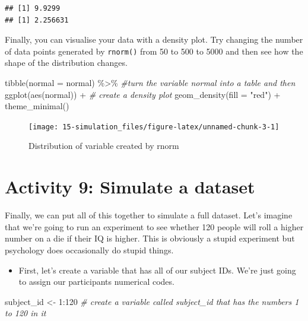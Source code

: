\documentclass[
  oneside]{book}
\newenvironment{Shaded}{\begin{snugshade}}{\end{snugshade}}
\newcommand{\AttributeTok}[1]{\textcolor[rgb]{0.77,0.63,0.00}{#1}}
\newcommand{\CommentTok}[1]{\textcolor[rgb]{0.56,0.35,0.01}{\textit{#1}}}
\newcommand{\DecValTok}[1]{\textcolor[rgb]{0.00,0.00,0.81}{#1}}
\newcommand{\FunctionTok}[1]{\textcolor[rgb]{0.00,0.00,0.00}{#1}}
\newcommand{\NormalTok}[1]{#1}
\newcommand{\OtherTok}[1]{\textcolor[rgb]{0.56,0.35,0.01}{#1}}
\newcommand{\SpecialCharTok}[1]{\textcolor[rgb]{0.00,0.00,0.00}{#1}}
\newcommand{\StringTok}[1]{\textcolor[rgb]{0.31,0.60,0.02}{#1}}
\providecommand{\tightlist}{%
  \setlength{\itemsep}{0pt}\setlength{\parskip}{0pt}}
\begin{document}
\begin{verbatim}
## [1] 9.9299
## [1] 2.256631
\end{verbatim}

Finally, you can visualise your data with a density plot. Try changing the number of data points generated by \texttt{rnorm()} from 50 to 500 to 5000 and then see how the shape of the distribution changes.

\begin{Shaded}
\begin{Highlighting}[]
\FunctionTok{tibble}\NormalTok{(}\AttributeTok{normal =}\NormalTok{ normal) }\SpecialCharTok{\%\textgreater{}\%} \CommentTok{\#turn the variable normal into a table and then}
  \FunctionTok{ggplot}\NormalTok{(}\FunctionTok{aes}\NormalTok{(normal)) }\SpecialCharTok{+} \CommentTok{\# create a density plot}
  \FunctionTok{geom\_density}\NormalTok{(}\AttributeTok{fill =} \StringTok{"red"}\NormalTok{) }\SpecialCharTok{+}
  \FunctionTok{theme\_minimal}\NormalTok{()}
\end{Highlighting}
\end{Shaded}

\begin{figure}

{\centering \texttt{[image: 15-simulation\_files/figure-latex/unnamed-chunk-3-1]} 

}

\caption{Distribution of variable created by rnorm}\label{fig:unnamed-chunk-3}
\end{figure}

\hypertarget{activity-9-simulate-a-dataset}{%
\section{Activity 9: Simulate a dataset}\label{activity-9-simulate-a-dataset}}

Finally, we can put all of this together to simulate a full dataset. Let's imagine that we're going to run an experiment to see whether 120 people will roll a higher number on a die if their IQ is higher. This is obviously a stupid experiment but psychology does occasionally do stupid things.

\begin{itemize}
\tightlist
\item
  First, let's create a variable that has all of our subject IDs. We're just going to assign our participants numerical codes.
\end{itemize}

\begin{Shaded}
\begin{Highlighting}[]
\NormalTok{subject\_id }\OtherTok{\textless{}{-}} \DecValTok{1}\SpecialCharTok{:}\DecValTok{120} \CommentTok{\# create a variable called subject\_id that has the numbers 1 to 120 in it}
\end{Highlighting}
\end{Shaded}
\end{document}
